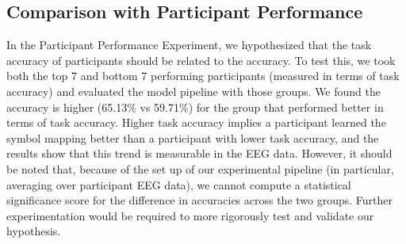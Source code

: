 
\subsection{Comparison with Participant Performance}
In the Participant Performance Experiment, we hypothesized that the task accuracy of participants should be related to the \tvt accuracy. To test this, we took both the top 7 and bottom 7 performing participants (measured in terms of task accuracy) and evaluated the model pipeline with those groups. We found the \tvt accuracy is higher (65.13\% vs 59.71\%) for the group that performed better in terms of task accuracy. Higher task accuracy implies a participant learned the symbol mapping better than a participant with lower task accuracy, and the \tvt results show that this trend is measurable in the EEG data.  However, it should be noted that, because of the set up of our experimental pipeline (in particular, averaging over participant EEG data), we cannot compute a statistical significance score for the difference in \tvt accuracies across the two groups.  Further experimentation would be required to more rigorously test and validate our hypothesis.
